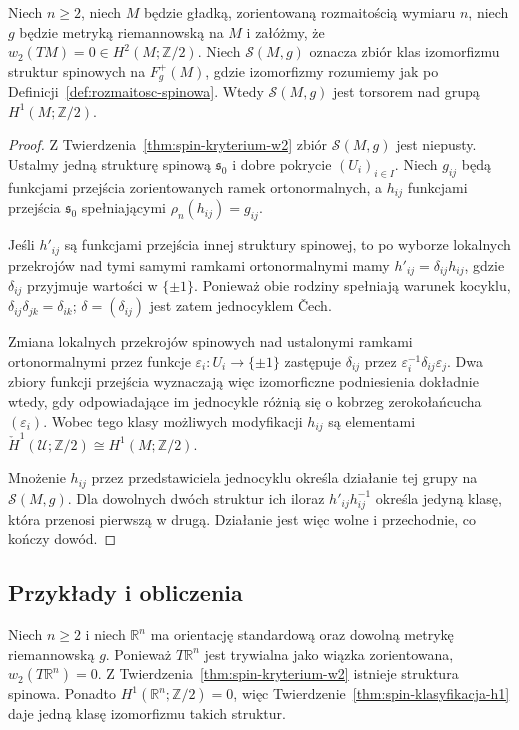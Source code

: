 \begin{twierdzenie}
\label{thm:spin-klasyfikacja-h1}
Niech $n\geq2$, niech $M$ będzie gładką, zorientowaną
rozmaitością wymiaru $n$, niech $g$ będzie metryką
riemannowską na $M$ i załóżmy, że
$w_2(TM)=0\in H^2(M;\mathbb Z/2)$.
Niech $\mathcal S(M,g)$ oznacza zbiór klas izomorfizmu
struktur spinowych na $F^+_g(M)$, gdzie izomorfizmy
rozumiemy jak po Definicji~\ref{def:rozmaitosc-spinowa}.
Wtedy $\mathcal S(M,g)$ jest torsorem nad grupą
$H^1(M;\mathbb Z/2)$.
\end{twierdzenie}
\begin{proof}
Z Twierdzenia~\ref{thm:spin-kryterium-w2} zbiór
$\mathcal S(M,g)$ jest niepusty. Ustalmy jedną
strukturę spinową $\mathfrak s_0$ i dobre pokrycie
$(U_i)_{i\in I}$. Niech $g_{ij}$ będą funkcjami
przejścia zorientowanych ramek ortonormalnych,
a $h_{ij}$ funkcjami przejścia $\mathfrak s_0$
spełniającymi $\rho_n(h_{ij})=g_{ij}$.

Jeśli $h'_{ij}$ są funkcjami przejścia innej
struktury spinowej, to po wyborze lokalnych
przekrojów nad tymi samymi ramkami ortonormalnymi
mamy $h'_{ij}=\delta_{ij}h_{ij}$, gdzie
$\delta_{ij}$ przyjmuje wartości w $\{\pm1\}$.
Ponieważ obie rodziny spełniają warunek kocyklu,
$\delta_{ij}\delta_{jk}=\delta_{ik}$;
$\delta=(\delta_{ij})$ jest zatem jednocyklem \v{C}ech.

Zmiana lokalnych przekrojów spinowych nad ustalonymi
ramkami ortonormalnymi przez funkcje
$\varepsilon_i:U_i\to\{\pm1\}$ zastępuje
$\delta_{ij}$ przez
$\varepsilon_i^{-1}\delta_{ij}\varepsilon_j$.
Dwa zbiory funkcji przejścia wyznaczają więc
izomorficzne podniesienia dokładnie wtedy,
gdy odpowiadające im jednocykle różnią się
o kobrzeg zerokołańcucha $(\varepsilon_i)$. Wobec tego klasy możliwych
modyfikacji $h_{ij}$ są elementami
$\check H^1(\mathcal U;\mathbb Z/2)
\cong H^1(M;\mathbb Z/2)$.

Mnożenie $h_{ij}$ przez przedstawiciela jednocyklu
określa działanie tej grupy na $\mathcal S(M,g)$.
Dla dowolnych dwóch struktur ich iloraz
$h'_{ij}h_{ij}^{-1}$ określa jedyną klasę,
która przenosi pierwszą w drugą. Działanie
jest więc wolne i przechodnie, co kończy dowód.
\end{proof}

\subsection{Przykłady i obliczenia}

\begin{przyklad}
Niech $n\geq2$ i niech $\mathbb R^n$ ma orientację
standardową oraz dowolną metrykę riemannowską $g$.
Ponieważ $T\mathbb R^n$ jest trywialna jako wiązka
zorientowana, $w_2(T\mathbb R^n)=0$.
Z Twierdzenia~\ref{thm:spin-kryterium-w2} istnieje
struktura spinowa. Ponadto
$H^1(\mathbb R^n;\mathbb Z/2)=0$, więc
Twierdzenie~\ref{thm:spin-klasyfikacja-h1} daje
jedną klasę izomorfizmu takich struktur.
\end{przyklad}

